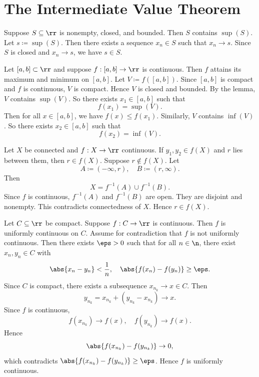
\section{The Intermediate Value Theorem}


\begin{lemma}{
    Suppose $S\subseteq\rr$ is nonempty, closed, and bounded.
    Then $S$ contains $\sup(S)$.
}
    Let $s\coloneqq \sup(S)$.
    Then there exists a sequence $x_n\in S$ such that $x_n\to s$.
    Since $S$ is closed and $x_n\to s$, we have $s\in S$.
\end{lemma}
\begin{theorem}{
    Let $[a,b]\subset\rr$ and suppose $f:[a,b]\to\rr$ is continuous.
    Then $f$ attains its maximum and minimum on $[a,b]$.
}
    Let $V\coloneqq f([a,b])$.
    Since $[a,b]$ is compact and $f$ is continuous, $V$ is compact.
    Hence $V$ is closed and bounded.
    By the lemma, $V$ contains $\sup(V)$.
    So there exists $x_1\in[a,b]$ such that
    \[
        f(x_1)=\sup(V).
    \]
    Then for all $x\in[a,b]$, we have $f(x)\leq f(x_1)$.
    Similarly, $V$ contains $\inf(V)$.
    So there exists $x_2\in[a,b]$ such that
    \[
        f(x_2)=\inf(V).
    \]
\end{theorem}

\begin{theorem}{
    Let $X$ be connected and $f:X\to\rr$ continuous.
    If $y_1,y_2\in f(X)$ and $r$ lies between them, then $r\in f(X)$.
}
    Suppose $r\notin f(X)$.
    Let
    \[
        A\coloneqq (-\infty,r), \quad B\coloneqq (r,\infty).
    \]
    Then
    \[
        X = f^{-1}(A)\cup f^{-1}(B).
    \]
    Since $f$ is continuous, $f^{-1}(A)$ and $f^{-1}(B)$ are open.
    They are disjoint and nonempty.
    This contradicts connectedness of $X$.
    Hence $r\in f(X)$.
\end{theorem}

\begin{theorem}{
    Let $C\subseteq\rr$ be compact.
    Suppose $f:C\to\rr$ is continuous.
    Then $f$ is uniformly continuous on $C$.
}
    Assume for contradiction that $f$ is not uniformly continuous.
    Then there exists $\eps >0$ such that for all $n\in\n$, there exist $x_n,y_n\in C$ with
    \[
        \abs{x_n-y_n} < \frac{1}{n}, \quad \abs{f(x_n)-f(y_n)}\geq \eps.
    \]
    Since $C$ is compact, there exists a subsequence $x_{n_k}\to x\in C$.
    Then
    \[
        y_{n_k} = x_{n_k} + (y_{n_k}-x_{n_k}) \to x.
    \]
    Since $f$ is continuous,
    \[
        f(x_{n_k})\to f(x), \quad f(y_{n_k})\to f(x).
    \]
    Hence
    \[
        \abs{f(x_{n_k})-f(y_{n_k})}\to 0,
    \]
    which contradicts $\abs{f(x_{n_k})-f(y_{n_k})}\geq \eps$.
    Hence $f$ is uniformly continuous.
\end{theorem}
